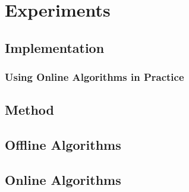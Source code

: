 
\chapter{Experiments}\label{chapter:experiments}

\section{Implementation}

\subsection{Using Online Algorithms in Practice}

\section{Method}

\section{Offline Algorithms}

\section{Online Algorithms}
